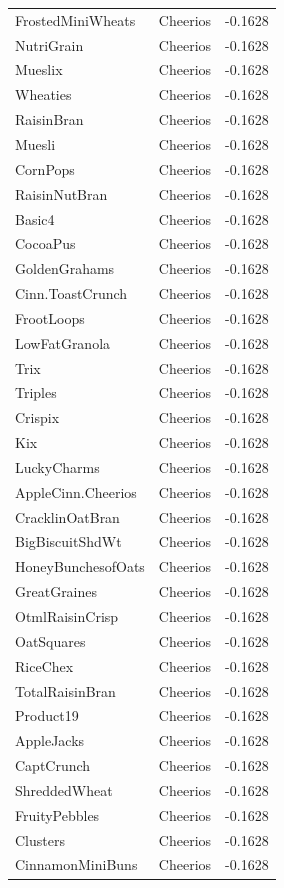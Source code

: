 \begin{longtable}{llr}
FrostedMiniWheats & Cheerios & -0.1628 \\
NutriGrain & Cheerios & -0.1628 \\
Mueslix & Cheerios & -0.1628 \\
Wheaties & Cheerios & -0.1628 \\
RaisinBran & Cheerios & -0.1628 \\
Muesli & Cheerios & -0.1628 \\
CornPops & Cheerios & -0.1628 \\
RaisinNutBran & Cheerios & -0.1628 \\
Basic4 & Cheerios & -0.1628 \\
CocoaPus & Cheerios & -0.1628 \\
GoldenGrahams & Cheerios & -0.1628 \\
Cinn.ToastCrunch & Cheerios & -0.1628 \\
FrootLoops & Cheerios & -0.1628 \\
LowFatGranola & Cheerios & -0.1628 \\
Trix & Cheerios & -0.1628 \\
Triples & Cheerios & -0.1628 \\
Crispix & Cheerios & -0.1628 \\
Kix & Cheerios & -0.1628 \\
LuckyCharms & Cheerios & -0.1628 \\
AppleCinn.Cheerios & Cheerios & -0.1628 \\
CracklinOatBran & Cheerios & -0.1628 \\
BigBiscuitShdWt & Cheerios & -0.1628 \\
HoneyBunchesofOats & Cheerios & -0.1628 \\
GreatGraines & Cheerios & -0.1628 \\
OtmlRaisinCrisp & Cheerios & -0.1628 \\
OatSquares & Cheerios & -0.1628 \\
RiceChex & Cheerios & -0.1628 \\
TotalRaisinBran & Cheerios & -0.1628 \\
Product19 & Cheerios & -0.1628 \\
AppleJacks & Cheerios & -0.1628 \\
CaptCrunch & Cheerios & -0.1628 \\
ShreddedWheat & Cheerios & -0.1628 \\
FruityPebbles & Cheerios & -0.1628 \\
Clusters & Cheerios & -0.1628 \\
CinnamonMiniBuns & Cheerios & -0.1628 \\

\end{longtable}
